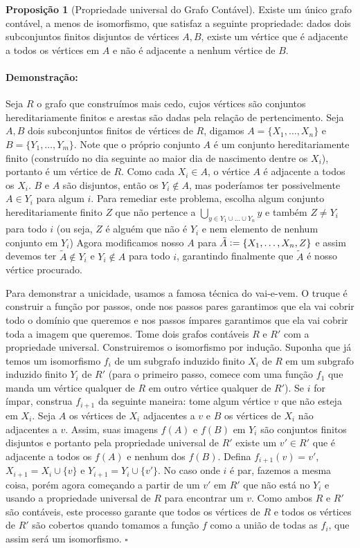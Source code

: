 \documentclass[11pt]{article}
\newcommand{\defeq}{\vcentcolon=}
\newcommand{\pulinho}{\vspace{.5cm}}
\theoremstyle{definition}
\theoremstyle{definition}
\theoremstyle{definition}
\newtheorem{prop}{Proposição}
\newenvironment{proposicao}{
\definecolor{shadecolor}{HTML}{FFDBDF}
\begin{shaded}
\begin{prop}
}
{
\end{prop}
\end{shaded}
}
\theoremstyle{definition}
\theoremstyle{definition}
\theoremstyle{definition}
\theoremstyle{definition}
\theoremstyle{definition}
\theoremstyle{definition}
\theoremstyle{definition}
\theoremstyle{definition}
\theoremstyle{definition}
\newenvironment{prova}{\paragraph{Demonstração:}}{\hfill$\square$ 
\pulinho
}
\theoremstyle{definition}
\begin{document}
\begin{proposicao}[Propriedade universal do Grafo Contável]
Existe um único grafo contável, a menos de isomorfismo, que satisfaz a seguinte propriedade: dados dois subconjuntos finitos disjuntos de vértices $A,B$, existe um vértice que é adjacente a todos os vértices em $A$ e não é adjacente a nenhum vértice de $B$.
\end{proposicao}
\begin{prova}
Seja $R$ o grafo que construímos mais cedo, cujos vértices são conjuntos hereditariamente finitos e arestas são dadas pela relação de pertencimento. Seja $A,B$ dois subconjuntos finitos de vértices de $R$, digamos $A = \{X_1, \dots, X_n\}$ e $B = \{Y_1, \dots, Y_m\}$. Note que o próprio conjunto $A$ é um conjunto hereditariamente finito (construído no dia seguinte ao  maior dia de nascimento dentre os $X_i$), portanto é um vértice de $R$. Como cada $X_i \in A$, o vértice $A$ é adjacente a todos os $X_i$. $B$ e $A$ são disjuntos, então os $Y_i \notin A$, mas poderíamos ter possivelmente $A \in Y_i$ para algum $i$. Para remediar este problema, escolha algum conjunto hereditariamente finito $Z$ que não pertence a $\underset{y \in Y_1\cup \dots \cup Y_n}{\bigcup }y$ e também $Z \neq Y_i$ para todo $i$ (ou seja, $Z$ é alguém que não é $Y_i$ e nem elemento de nenhum conjunto em $Y_i$) Agora modificamos nosso $A$ para $\tilde{A} \defeq \{X_1, \dots, X_n, Z\}$ e assim devemos ter $\tilde{A} \notin Y_i$ e $Y_i \notin A$ para todo $i$, garantindo finalmente que $\tilde{A}$ é nosso vértice procurado.

Para demonstrar a unicidade, usamos a famosa técnica do vai-e-vem. O truque é construir a função por passos, onde nos passos pares garantimos que ela vai cobrir todo o domínio que queremos e nos passos ímpares garantimos que ela vai cobrir toda a imagem que queremos. Tome dois grafos contáveis $R$ e $R'$ com a propriedade universal. Construiremos o isomorfismo por indução. Suponha que já temos um isomorfismo $f_i$ de um subgrafo induzido finito $X_i $ de $R$ em um subgrafo induzido finito $Y_i$ de $R'$ (para o primeiro passo, comece com uma função $f_1$ que manda um vértice qualquer de $R$ em outro vértice qualquer de $R'$). Se $i$ for ímpar, construa $f_{i+1}$ da seguinte maneira: tome algum vértice $v$ que não esteja em $X_i$. Seja $A$ os vértices de $X_i$ adjacentes a $v$ e $B$ os vértices de $X_i$ não adjacentes a $v$. Assim, suas imagens $f(A)$ e $f(B)$ em $Y_i$ são conjuntos finitos disjuntos e portanto pela propriedade universal de $R'$ existe um $v' \in R'$ que é adjacente a todos os $f(A)$ e nenhum dos $f(B)$. Defina $f_{i+1}(v) = v'$, $X_{i+1} = X_i \cup \{v\}$ e $Y_{i+1} = Y_i \cup \{v'\}$. No caso onde $i$ é par, fazemos a mesma coisa, porém agora começando a partir de um $v'$ em $R'$ que não está no $Y_i$ e usando a propriedade universal de $R$ para encontrar um $v$. Como ambos $R$ e $R'$ são contáveis, este processo garante que todos os vértices de $R$ e todos os vértices de $R'$ são cobertos quando tomamos a função $f$ como a união de todas as $f_i$, que assim será um isomorfismo.
\end{prova}
\end{document}
